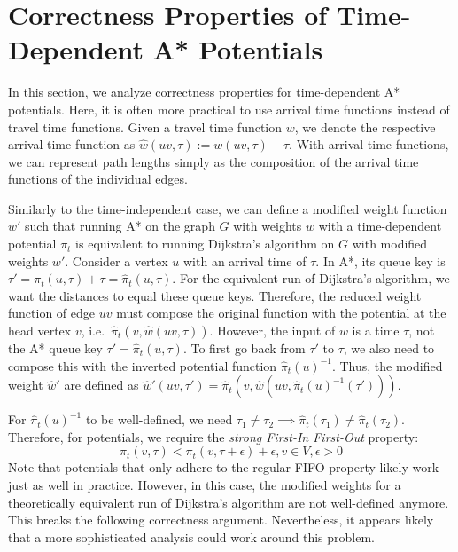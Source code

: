 \documentclass[a4paper,UKenglish,cleveref, autoref, thm-restate,anonymous]{lipics-v2021}
\begin{document}
\section{Correctness Properties of Time-Dependent A* Potentials}\label{sec:appendix:correctness}

In this section, we analyze correctness properties for time-dependent A* potentials.
Here, it is often more practical to use arrival time functions instead of travel time functions.
Given a travel time function $w$, we denote the respective arrival time function as $\hat{w}(uv, \tau) := w(uv, \tau) + \tau$.
With arrival time functions, we can represent path lengths simply as the composition of the arrival time functions of the individual edges.

Similarly to the time-independent case, we can define a modified weight function $w'$ such that running A* on the graph $G$ with weights $w$ with a time-dependent potential $\pi_t$ is equivalent to running Dijkstra's algorithm on $G$ with modified weights $w'$.
Consider a vertex $u$ with an arrival time of $\tau$.
In A*, its queue key is $\tau' = \pi_t(u, \tau) + \tau = \hat{\pi}_t(u, \tau)$.
For the equivalent run of Dijkstra's algorithm, we want the distances to equal these queue keys.
Therefore, the reduced weight function of edge $uv$ must compose the original function with the potential at the head vertex $v$, i.e.\ $\hat{\pi}_t(v, \hat{w}(uv, \tau))$.
However, the input of $w$ is a time $\tau$, not the A* queue key $\tau' = \hat{\pi}_t(u, \tau)$.
To first go back from $\tau'$ to $\tau$, we also need to compose this with the inverted potential function $\hat{\pi}_t(u)^{-1}$.
Thus, the modified weight $\hat{w}'$ are defined as $\hat{w}'(uv, \tau') = \hat{\pi}_t(v, \hat{w}(uv, \hat{\pi}_t(u)^{-1}(\tau')))$.

For $\hat{\pi}_t(u)^{-1}$ to be well-defined, we need $\tau_1 \neq \tau_2 \implies \hat{\pi}_t(\tau_1) \neq \hat{\pi}_t(\tau_2)$.
Therefore, for potentials, we require the \emph{strong First-In First-Out} property:
\[
\pi_t(v, \tau) < \pi_t(v, \tau + \epsilon) + \epsilon, v \in V, \epsilon > 0
\]
Note that potentials that only adhere to the regular FIFO property likely work just as well in practice.
However, in this case, the modified weights for a theoretically equivalent run of Dijkstra's algorithm are not well-defined anymore.
This breaks the following correctness argument.
Nevertheless, it appears likely that a more sophisticated analysis could work around this problem.
\end{document}
